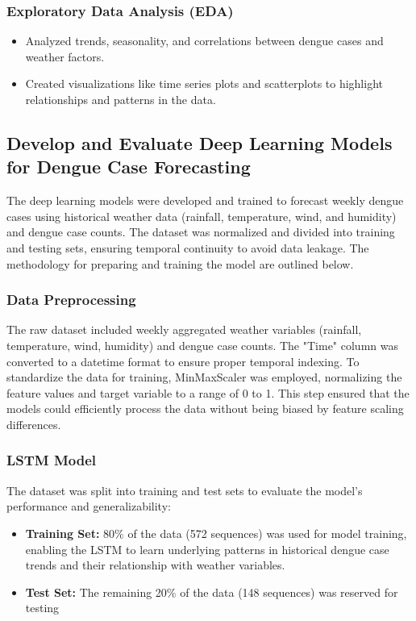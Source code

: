 \subsubsection{Exploratory Data Analysis (EDA)}
\begin{itemize}
	\item Analyzed trends, seasonality, and correlations between dengue cases and weather factors.
	\item Created visualizations like time series plots and scatterplots to highlight relationships and patterns in the data.
\end{itemize}

\subsection{Develop and Evaluate Deep Learning Models for Dengue Case Forecasting}
The deep learning models were developed and trained to forecast weekly dengue cases using historical weather data (rainfall, temperature, wind, and humidity) and dengue case counts. The dataset was normalized and divided into training and testing sets, ensuring temporal continuity to avoid data leakage. The methodology for preparing and training the model are outlined below.
\subsubsection{Data Preprocessing}
The raw dataset included weekly aggregated weather variables (rainfall, temperature, wind, humidity) and dengue case counts. The "Time" column was converted to a datetime format to ensure proper temporal indexing. To standardize the data for training, MinMaxScaler was employed, normalizing the feature values and target variable to a range of 0 to 1. This step ensured that the models could efficiently process the data without being biased by feature scaling differences.

\subsubsection{LSTM Model}
The dataset was split into training and test sets to evaluate the model’s performance and generalizability:
\begin{itemize}
	\item \textbf{Training Set:} 80\% of the data (572 sequences) was used for model training, enabling the LSTM to learn underlying patterns in historical dengue case trends and their relationship with weather variables.
	\item \textbf{Test Set:} The remaining 20\% of the data (148 sequences) was reserved for testing
\end{itemize}

